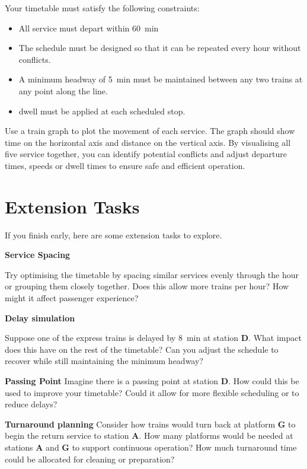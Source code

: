 \documentclass[a4paper]{article}
\begin{document}
	Your timetable must satisfy the following constraints:
	\begin{itemize}
		\item All service must depart within \qty{60}{\minute}
		\item The schedule must be designed so that it can be repeated every hour without conflicts.
		\item A minimum \gls{headway} of \qty{5}{\minute} must be maintained between any two trains at any point along the line.
		\item \gls{dwell} must be applied at each scheduled stop.
	\end{itemize}
	
	Use a train graph to plot the movement of each service. The graph should show time on the horizontal axis and distance on the vertical axis. By visualising all five service together, you can identify potential conflicts and adjust departure times, speeds or dwell times to ensure safe and efficient operation.
	
	\section{Extension Tasks}
	If you finish early, here are some extension tasks to explore.
	
	\textbf{Service Spacing}
	
	Try optimising the timetable by spacing similar services evenly through the hour or grouping them closely together. Does this allow more trains per hour? How might it affect passenger experience?
	
	\textbf{Delay simulation} 
	
	Suppose one of the express trains is delayed by \qty{8}{\minute} at station \textbf{D}. What impact does this have on the rest of the timetable? Can you adjust the schedule to recover while still maintaining the minimum headway?
	
	\textbf{Passing Point}
	Imagine there is a passing point at station \textbf{D}. How could this be used to improve your timetable? Could it allow for more flexible scheduling or to reduce delays?
	
	\textbf{Turnaround planning}
	\textbf{}
	Consider how trains would turn back at platform \textbf{G} to begin the return service to station \textbf{A}. How many platforms would be needed at stations \textbf{A} and \textbf{G} to support continuous operation? How much turnaround time could be allocated for cleaning or preparation?
	
	\printnoidxglossaries
	
\end{document}

